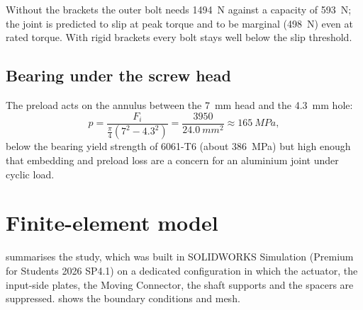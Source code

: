 \documentclass[11pt,letterpaper]{article}
\begin{document}
Without the brackets the outer bolt needs \SI{1494}{\newton} against a capacity of
\SI{593}{\newton}; the joint is predicted to slip at peak torque and to be marginal
(\SI{498}{\newton}) even at rated torque. With rigid brackets every bolt stays well below
the slip threshold.

\subsection{Bearing under the screw head}
The preload acts on the annulus between the \SI{7}{mm} head and the \SI{4.3}{mm} hole:
\begin{equation}
  p = \frac{F_i}{\tfrac{\pi}{4}(7^2-4.3^2)} = \frac{3950}{\SI{24.0}{mm^2}}
    \approx \SI{165}{MPa},
\end{equation}
below the bearing yield strength of 6061-T6 (about \SI{386}{MPa}) but high enough that
embedding and preload loss are a concern for an aluminium joint under cyclic load.

\section{Finite-element model}
 summarises the study, which was built in SOLIDWORKS Simulation
(Premium for Students 2026 SP4.1) on a dedicated configuration in which the actuator,
the input-side plates, the Moving Connector, the shaft supports and the spacers are
suppressed.  shows the boundary conditions and mesh.
\end{document}

